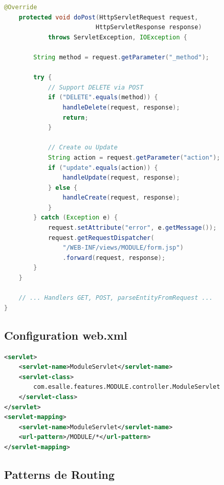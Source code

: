 \documentclass[12pt,a4paper]{article}
\begin{document}
\begin{lstlisting}[language=Java, caption=Template Servlet Controller]
    @Override
    protected void doPost(HttpServletRequest request, 
                         HttpServletResponse response) 
            throws ServletException, IOException {
        
        String method = request.getParameter("_method");
        
        try {
            // Support DELETE via POST
            if ("DELETE".equals(method)) {
                handleDelete(request, response);
                return;
            }
            
            // Create ou Update
            String action = request.getParameter("action");
            if ("update".equals(action)) {
                handleUpdate(request, response);
            } else {
                handleCreate(request, response);
            }
        } catch (Exception e) {
            request.setAttribute("error", e.getMessage());
            request.getRequestDispatcher(
                "/WEB-INF/views/MODULE/form.jsp")
                .forward(request, response);
        }
    }
    
    // ... Handlers GET, POST, parseEntityFromRequest ...
}
\end{lstlisting}

\subsection{Configuration web.xml}

\begin{lstlisting}[language=XML, caption=Enregistrement du Servlet]
<servlet>
    <servlet-name>ModuleServlet</servlet-name>
    <servlet-class>
        com.esalle.features.MODULE.controller.ModuleServlet
    </servlet-class>
</servlet>
<servlet-mapping>
    <servlet-name>ModuleServlet</servlet-name>
    <url-pattern>/MODULE/*</url-pattern>
</servlet-mapping>
\end{lstlisting}

\subsection{Patterns de Routing}
\end{document}
